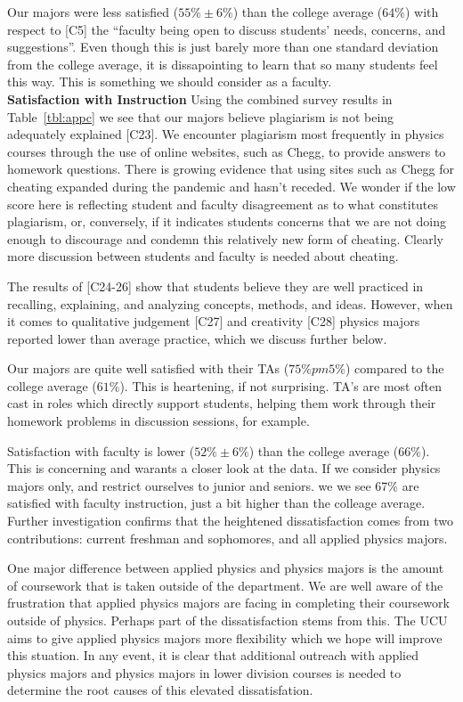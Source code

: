 \documentclass[12pt]{article}
\begin{document}
Our majors were less satisfied ($55\%\pm6\%$) than the college
average ($64\%$) with respect to [C5] the ``faculty being open to
discuss students' needs, concerns, and suggestions''.  Even though
this is just barely more than one standard deviation from the college
average, it is dissapointing to learn that so many students feel this
way.  This is something we should consider as a faculty.\\[3pt]

\noindent
{\bf Satisfaction with Instruction} Using the combined survey results
in Table~\ref{tbl:appc} we see that our majors believe plagiarism is
not being adequately explained [C23].  We encounter plagiarism most
frequently in physics courses through the use of online websites, such
as Chegg, to provide answers to homework questions.  There is growing
evidence that using sites such as Chegg for cheating expanded during
the pandemic and hasn't receded.  We wonder if the low score here is
reflecting student and faculty disagreement as to what constitutes
plagiarism, or, conversely, if it indicates students concerns that we
are not doing enough to discourage and condemn this relatively new
form of cheating.  Clearly more discussion between students and
faculty is needed about cheating.

The results of [C24-26] show that students believe they are well
practiced in recalling, explaining, and analyzing concepts, methods,
and ideas.  However, when it comes to qualitative judgement [C27] and
creativity [C28] physics majors reported lower than average practice,
which we discuss further below.

Our majors are quite well satisfied with their TAs ($75\% pm 5\%$)
compared to the college average ($61\%$).  This is heartening, if not
surprising.  TA's are most often cast in roles which directly support
students, helping them work through their homework problems in
discussion sessions, for example.

Satisfaction with faculty is lower ($52\% \pm 6\%$) than the college
average ($66\%$).  This is concerning and warants a closer look at the
data.  If we consider physics majors only, and restrict ourselves to
junior and seniors. we we see 67\% are satisfied with faculty
instruction, just a bit higher than the colleage average.  Further
investigation confirms that the heightened dissatisfaction comes from
two contributions: current freshman and sophomores, and all applied
physics majors.

One major difference between applied physics and physics majors is the
amount of coursework that is taken outside of the department. We
are well aware of the frustration that applied physics majors are
facing in completing their coursework outside of physics.  Perhaps
part of the dissatisfaction stems from this.  The UCU aims to give
applied physics majors more flexibility which we hope will improve
this stuation.  In any event, it is clear that additional outreach
with applied physics majors and physics majors in lower division
courses is needed to determine the root causes of this elevated
dissatisfation.\\[3pt]
\end{document}
